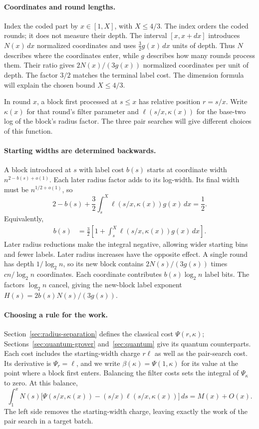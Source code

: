 \documentclass[runningheads,envcountsame,envcountsect,orivec]{llncs}
\begin{document}
\paragraph{Coordinates and round lengths.}
Index the coded part by $x\in[1,X]$, with $X\le4/3$.
The index orders the coded rounds; it does not measure their depth. The interval
$[x,x+dx]$ introduces $N(x)\,dx$ normalized coordinates and
uses $\tfrac32g(x)\,dx$ units of depth. Thus $N$ describes
where the coordinates enter, while $g$ describes how many
rounds process them. Their ratio gives
$2N(x)/(3g(x))$ normalized coordinates per unit of depth.
The factor $3/2$ matches the terminal label cost.
The dimension formula will explain the chosen bound $X\le4/3$.

In round $x$, a block first processed at $s\le x$ has relative
position $r=s/x$. Write $\kappa(x)$ for that round's filter
parameter and $\ell(s/x,\kappa(x))$ for the base-two log of
the block's radius factor. The three pair searches will give
different choices of this function.

\paragraph{Starting widths are determined backwards.}
A block introduced at $s$ with label cost $b(s)$ starts at
coordinate width $n^{2-b(s)+o(1)}$. Each later radius factor
adds to its log-width. Its final width must be
$n^{1/2+o(1)}$, so
\[
 2-b(s)+\frac32\int_s^X
       \ell(s/x,\kappa(x))g(x)\,dx=\frac12.
\]
Equivalently,
\begin{align}
 b(s)&=\frac32\left[1+\int_s^X
                  \ell(s/x,\kappa(x))g(x)\,dx\right].
 \label{eq:shared-birth}
\end{align}
Later radius reductions make the integral negative, allowing
wider starting bins and fewer labels. Later radius increases
have the opposite effect. A single round has depth $1/\log_2 n$,
so its new block contains $2N(s)/(3g(s))$ times
$cn/\log_2 n$ coordinates. Each coordinate contributes
$b(s)\log_2 n$ label bits. The factors $\log_2 n$ cancel,
giving the new-block label exponent
$H(s)=2b(s)N(s)/(3g(s))$.

\paragraph{Choosing a rule for the work.}
Section~\ref{sec:radius-separation} defines the classical cost
$\Psi(r,\kappa)$; Sections~\ref{sec:quantum-grover} and~\ref{sec:quantum}
give its quantum counterparts. Each cost includes the
starting-width charge $r\ell$ as well as the pair-search cost.
Its derivative is $\Psi_r=\ell$, and we write
$\beta(\kappa)=\Psi(1,\kappa)$ for its value at the point
where a block first enters.
Balancing the filter costs sets the integral of
$\Psi_\kappa$ to zero. At this balance,
\[
 \int_1^xN(s)\bigl[\Psi(s/x,\kappa(x))
          -(s/x)\ell(s/x,\kappa(x))\bigr]\,ds=M(x)+O(x).
\]
The left side removes the starting-width charge, leaving
exactly the work of the pair search in a target batch.
\end{document}
